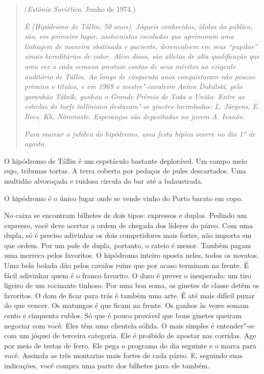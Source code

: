 \begin{quotation}
\begin{flushright}
(\emph{Estônia Soviética}. Junho de 1974.)
\end{flushright}
\vspace{4pt}
\noindent\emph{Ê (Hipódromo de Tállin: 50 anos). Jóqueis
conhecidos, ídolos do público, são, em primeiro lugar, zootecnistas
escolados que aprimoram uma linhagem de maneira obstinada e paciente,
desenvolvem em seus ``pupilos'' sinais hereditários de valor. Além
disso, são atletas de alta qualificação que uma vez a cada semana
prestam contas de seus méritos ao exigente auditório de Tállin. Ao longo
de cinquenta anos conquistaram não poucos prêmios e títulos, e em 1969 o
mestre"-cavaleiro Anton Dukálski, pelo garanhão Tálnik, ganhou o Grande
Prêmio de Toda a União. Entre as estrelas do turfe talliniano
destacam"-se ginetes tarimbados: L. Jürgens, E. Ilves, Kh. Nõmmiste.
Esperanças são depositadas no jovem A. Ivanóv.}

\emph{Para marcar o jubileu do hipódromo, uma festa hípica ocorre no dia 1º de agosto.}
\end{quotation}

O hipódromo de Tállin é um espetáculo bastante deplorável. Um campo meio
sujo, tribunas tortas. A terra coberta por pedaços de pules descartados.
Uma multidão alvoroçada e ruidosa circula do bar até a balaustrada.

O hipódromo é o único lugar onde se vende vinho do Porto barato em copo.

No caixa se encontram bilhetes de dois tipos: expressos e duplas.
Pedindo um expresso, você deve acertar a ordem de chegada dos líderes do
páreo. Com uma dupla, só é preciso adivinhar os dois competidores mais
fortes, não importa em que ordem. Por um pule de dupla, portanto, o
rateio é menor. Também pagam uma merreca pelos favoritos. O hipódromo
inteiro aposta neles, todos os novatos. Uma bela bolada dão pelos
cavalos ruins que por acaso terminam na frente. É fácil adivinhar quem é
o franco favorito. O duro é prever o inesperado: um tiro ligeiro de um
rocinante tinhoso. Por uma boa soma, os ginetes de classe detêm os
favoritos. O dom de ficar para trás é também uma arte. É até mais
difícil puxar do que vencer. Os matungos é que ficam na frente. Os
ganhos às vezes somam cento e cinquenta rublos. Só que é pouco provável
que bons ginetes queiram negociar com você. Eles têm uma clientela
sólida. O mais simples é entender"-se com um jóquei de terceira
categoria. Ele é proibido de apostar nas corridas. Age por meio de
testas de ferro. Ele pega o programa do dia seguinte e o marca para
você. Assinala as três montarias mais fortes de cada páreo. E, seguindo
suas indicações, você compra uma parte dos bilhetes para ele também.

